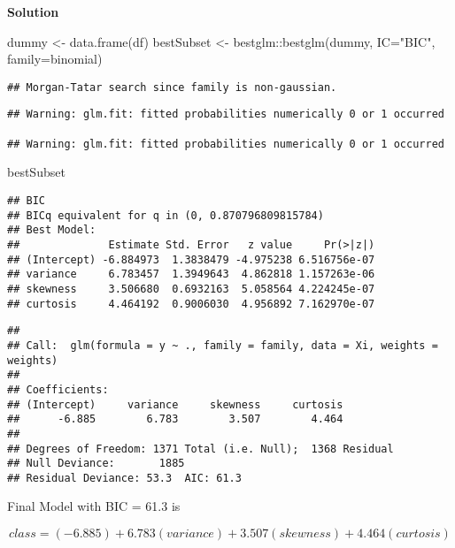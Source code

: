 \documentclass[
]{article}
\newenvironment{Shaded}{\begin{snugshade}}{\end{snugshade}}
\newcommand{\AttributeTok}[1]{\textcolor[rgb]{0.77,0.63,0.00}{#1}}
\newcommand{\FunctionTok}[1]{\textcolor[rgb]{0.00,0.00,0.00}{#1}}
\newcommand{\NormalTok}[1]{#1}
\newcommand{\OtherTok}[1]{\textcolor[rgb]{0.56,0.35,0.01}{#1}}
\newcommand{\SpecialCharTok}[1]{\textcolor[rgb]{0.00,0.00,0.00}{#1}}
\newcommand{\StringTok}[1]{\textcolor[rgb]{0.31,0.60,0.02}{#1}}
\begin{document}
\textbf{\large{Solution}}

\begin{Shaded}
\begin{Highlighting}[]
\NormalTok{dummy }\OtherTok{\textless{}{-}} \FunctionTok{data.frame}\NormalTok{(df)}
\NormalTok{bestSubset }\OtherTok{\textless{}{-}}\NormalTok{ bestglm}\SpecialCharTok{::}\FunctionTok{bestglm}\NormalTok{(dummy, }\AttributeTok{IC=}\StringTok{"BIC"}\NormalTok{, }\AttributeTok{family=}\NormalTok{binomial)}
\end{Highlighting}
\end{Shaded}

\begin{verbatim}
## Morgan-Tatar search since family is non-gaussian.
\end{verbatim}

\begin{verbatim}
## Warning: glm.fit: fitted probabilities numerically 0 or 1 occurred

## Warning: glm.fit: fitted probabilities numerically 0 or 1 occurred
\end{verbatim}

\begin{Shaded}
\begin{Highlighting}[]
\NormalTok{bestSubset}
\end{Highlighting}
\end{Shaded}

\begin{verbatim}
## BIC
## BICq equivalent for q in (0, 0.870796809815784)
## Best Model:
##              Estimate Std. Error   z value     Pr(>|z|)
## (Intercept) -6.884973  1.3838479 -4.975238 6.516756e-07
## variance     6.783457  1.3949643  4.862818 1.157263e-06
## skewness     3.506680  0.6932163  5.058564 4.224245e-07
## curtosis     4.464192  0.9006030  4.956892 7.162970e-07
\end{verbatim}

\begin{Shaded}
\end{Shaded}

\begin{verbatim}
## 
## Call:  glm(formula = y ~ ., family = family, data = Xi, weights = weights)
## 
## Coefficients:
## (Intercept)     variance     skewness     curtosis  
##      -6.885        6.783        3.507        4.464  
## 
## Degrees of Freedom: 1371 Total (i.e. Null);  1368 Residual
## Null Deviance:       1885 
## Residual Deviance: 53.3  AIC: 61.3
\end{verbatim}

Final Model with BIC = 61.3 is

\[
class = (-6.885) + 6.783(variance) + 3.507(skewness) + 4.464(curtosis)
\]
\end{document}
